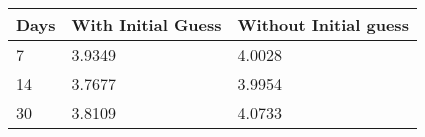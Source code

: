 \begin{tabular}{lll}
Days & With Initial Guess & Without Initial guess \\ 
\hline 
7 & 3.9349 & 4.0028 \\ 
14 & 3.7677 & 3.9954 \\ 
30 & 3.8109 & 4.0733 \\ 
\hline 
\end{tabular}
